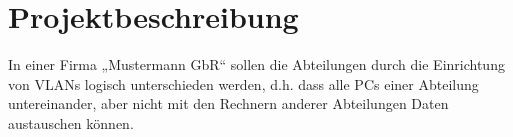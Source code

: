\section{Projektbeschreibung}

In einer Firma „Mustermann GbR“ sollen die Abteilungen durch die Einrichtung von VLANs
logisch unterschieden werden, d.h. dass alle PCs einer Abteilung untereinander, aber nicht
mit den Rechnern anderer Abteilungen Daten austauschen können.